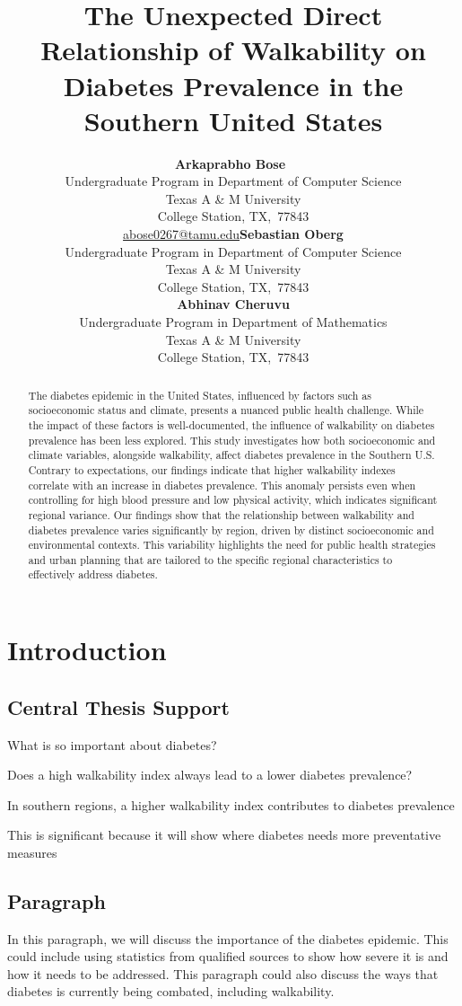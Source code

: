 \documentclass[
]{article}
\title{The Unexpected Direct Relationship of Walkability on Diabetes
Prevalence in the Southern United States}
\author{\textbf{Arkaprabho
Bose}~\orcidlink{0000-0003-2402-304X}\\Undergraduate Program in
Department of Computer Science\\Texas A \& M University\\College
Station,
TX,\ 77843\\\href{mailto:abose0267@tamu.edu}{abose0267@tamu.edu}\asep\textbf{Sebastian
Oberg}\\Undergraduate Program in Department of Computer Science\\Texas A
\& M University\\College Station, TX,\ 77843\\\asep\textbf{Abhinav
Cheruvu}\\Undergraduate Program in Department of Mathematics\\Texas A \&
M University\\College Station, TX,\ 77843\\}
\date{}
\begin{document}
\maketitle
\begin{abstract}
The diabetes epidemic in the United States, influenced by factors such
as socioeconomic status and climate, presents a nuanced public health
challenge. While the impact of these factors is well-documented, the
influence of walkability on diabetes prevalence has been less explored.
This study investigates how both socioeconomic and climate variables,
alongside walkability, affect diabetes prevalence in the Southern U.S.
Contrary to expectations, our findings indicate that higher walkability
indexes correlate with an increase in diabetes prevalence. This anomaly
persists even when controlling for high blood pressure and low physical
activity, which indicates significant regional variance. Our findings
show that the relationship between walkability and diabetes prevalence
varies significantly by region, driven by distinct socioeconomic and
environmental contexts. This variability highlights the need for public
health strategies and urban planning that are tailored to the specific
regional characteristics to effectively address diabetes.
\end{abstract}

\section{Introduction}\label{sec-intro}

\subsection{Central Thesis Support}\label{central-thesis-support}

What is so important about diabetes?

Does a high walkability index always lead to a lower diabetes
prevalence?

In southern regions, a higher walkability index contributes to diabetes
prevalence

This is significant because it will show where diabetes needs more
preventative measures

\subsection{Paragraph}\label{paragraph}

In this paragraph, we will discuss the importance of the diabetes
epidemic. This could include using statistics from qualified sources to
show how severe it is and how it needs to be addressed. This paragraph
could also discuss the ways that diabetes is currently being combated,
including walkability.
\end{document}

